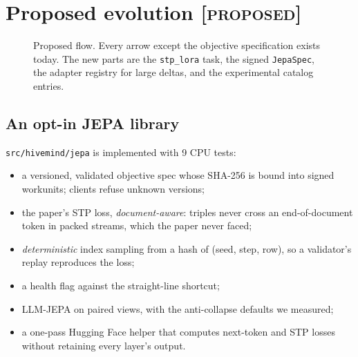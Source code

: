 \documentclass[11pt]{article}
\newcommand{\proposed}{\textnormal{\textsc{[proposed]}}}
\begin{document}
\section{Proposed evolution \proposed}
\begin{figure}[t]
\centering
{}
\caption{Proposed flow. Every arrow except the objective specification exists today. The new parts are the
\texttt{stp\_lora} task, the signed \texttt{JepaSpec}, the adapter registry for large deltas, and the experimental
catalog entries.}
\label{fig:arch}
\end{figure}

\subsection{An opt-in JEPA library}
\texttt{src/hivemind/jepa} is implemented with 9 CPU tests:
\begin{itemize}
\item a versioned, validated objective spec whose SHA-256 is bound into signed workunits; clients refuse unknown
versions;
\item the paper's STP loss, \emph{document-aware}: triples never cross an end-of-document token in packed streams, which
the paper never faced;
\item \emph{deterministic} index sampling from a hash of (seed, step, row), so a validator's replay reproduces the loss;
\item a health flag against the straight-line shortcut;
\item LLM-JEPA on paired views, with the anti-collapse defaults we measured;
\item a one-pass Hugging Face helper that computes next-token and STP losses without retaining every layer's output.
\end{itemize}
\end{document}
